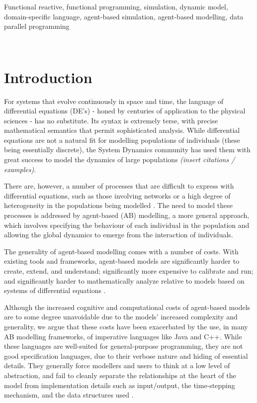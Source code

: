 \documentclass{sig-alternate}
\begin{document}

\keywords
Functional reactive, functional programming, simulation, dynamic model, domain-specific language, agent-based simulation, agent-based modelling, data parallel programming

\


\section{Introduction}

For systems that evolve continuously in space and time, the language of differential equations (DE's) - honed by centuries of application to the physical sciences - has no substitute. Its syntax is extremely terse, with precise mathematical semantics that permit sophisticated analysis. While differential equations are not a natural fit for modelling populations of individuals (these being essentially discrete), the System Dynamics community has used them with great success to model the dynamics of large populations \textit{(insert citations  / examples)}. 

  There are, however,  a number of processes that are difficult to express with differential equations, such as those involving networks or a high degree of heterogeneity in the populations being modelled \cite{system_dyn_tradeoffs}. The need to model these processes is addressed by agent-based (AB) modelling, a more general approach, which involves specifying the behaviour of each individual in the population and allowing the global dynamics to emerge from the interaction of individuals. 
  
  The generality of agent-based modelling comes with a number of costs. With existing tools and frameworks, agent-based models are significantly harder to create, extend, and understand; significantly more expensive to calibrate and run; and significantly harder to mathematically analyze relative to models based on systems of differential equations \cite{ab_vs_de}. 
  
  Although the increased cognitive and computational costs of agent-based models are to some degree unavoidable due to the models' increased complexity and generality, we argue that these costs have been exacerbated by the use, in many AB modelling frameworks, of imperative languages like Java and C++. While these languages are well-suited for general-purpose programming, they are not good specification languages, due to their verbose nature and hiding of essential details. They generally force modellers and users to think at a low level of abstraction, and fail to cleanly separate the relationships at the heart of the model from implementation details such as input/output, the time-stepping mechanism, and the data structures used \cite{system_dyn_tradeoffs}. 
  
\end{document}
